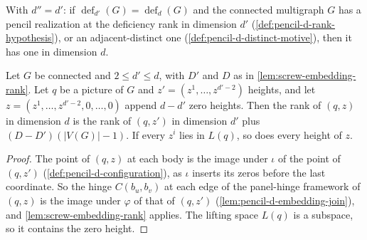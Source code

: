 With $d'' = d'$: if $\operatorname{def}_{d'}(G) = \operatorname{def}_d(G)$
and the connected multigraph $G$ has a pencil realization at the
deficiency rank in dimension $d'$ (\cref{def:pencil-d-rank-hypothesis}),
or an adjacent-distinct one (\cref{def:pencil-d-distinct-motive}), then
it has one in dimension $d$.

\begin{lemma}
  \label{lem:pencil-d-embed-config-rank}
  \leanok
  Let $G$ be connected and $2 \le d' \le d$, with $D'$ and $D$ as in
  \cref{lem:screw-embedding-rank}. Let $q$ be a picture of $G$ and
  $z' = (z^1, \dots, z^{d'-2})$ heights, and let
  $z = (z^1, \dots, z^{d'-2}, 0, \dots, 0)$ append $d - d'$ zero
  heights. Then the rank of $(q, z)$ in dimension $d$ is the rank of
  $(q, z')$ in dimension $d'$ plus $(D - D')(|V(G)| - 1)$. If every
  $z^i$ lies in $L(q)$, so does every height of $z$.
\end{lemma}
\begin{proof}
  \leanok
  The point of $(q, z)$ at each body is the image under $\iota$ of the
  point of $(q, z')$ (\cref{def:pencil-d-configuration}), as $\iota$
  inserts its zeros before the last coordinate. So the hinge
  $C(b_u, b_v)$ at each edge of the panel-hinge framework of $(q, z)$ is
  the image under $\varphi$ of that of $(q, z')$
  (\cref{lem:pencil-d-embedding-join}), and
  \cref{lem:screw-embedding-rank} applies. The lifting space $L(q)$ is a
  subspace, so it contains the zero height.
\end{proof}

